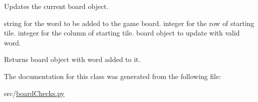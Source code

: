 Updates the current board object. 

string for the word to be added to the game board.  integer for the row of starting tile.  integer for the column of starting tile.  board object to update with valid word. \begin{DoxyReturn}{Returns}
board object with word added to it. 
\end{DoxyReturn}


The documentation for this class was generated from the following file\+:\begin{DoxyCompactItemize}
\item 
src/\hyperlink{board_checks_8py}{board\+Checks.\+py}\end{DoxyCompactItemize}
